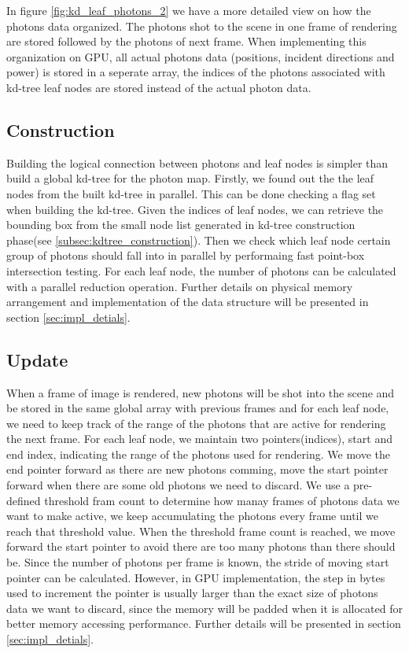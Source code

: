 In figure \ref{fig:kd_leaf_photons_2} we have a more detailed view on how the photons data organized. The photons shot to the scene in one frame of rendering are stored followed by the photons of next frame. When implementing this organization on GPU, all actual photons data (positions, incident directions and power) is stored in a seperate array, the indices of the photons associated with kd-tree leaf nodes are stored instead of the actual photon data. 

\subsection{Construction} 

Building the logical connection between photons and leaf nodes is simpler than build a global kd-tree for the photon map. Firstly, we found out the the leaf nodes from the built kd-tree in parallel. This can be done checking a flag set when building the kd-tree. Given the indices of leaf nodes, we can retrieve the bounding box from the small node list generated in kd-tree construction phase(see \ref{subsec:kdtree_construction}). Then we check which leaf node certain group of photons should fall into in parallel by performaing fast point-box intersection testing. For each leaf node, the number of photons can be calculated with a parallel reduction operation. Further details on physical memory arrangement and implementation of the data structure  will be presented in section \ref{sec:impl_detials}. 

\subsection{Update} 

When a frame of image is rendered, new photons will be shot into the scene and be stored in the same global array with previous frames and for each leaf node, we need to keep track of the range of the photons that are active for rendering the next frame. For each leaf node, we maintain two pointers(indices), start and end index, indicating the range of the photons used for rendering. We move the end pointer forward as there are new photons comming, move the start pointer forward when there are some old photons we need to discard. We use a pre-defined threshold fram count to determine how manay frames of photons data we want to make active, we keep accumulating the photons every frame until we reach that threshold value. When the threshold frame count 
is reached, we move forward the start pointer to avoid there are too many photons than there should be. Since the number of photons per frame is known, the stride of moving start pointer can be calculated. However, in GPU implementation, the step in bytes used to increment the pointer is usually larger than the exact size of photons data we want to discard, since the memory will be padded when it is allocated for better memory accessing performance. Further details will be presented in section \ref{sec:impl_detials}. 

